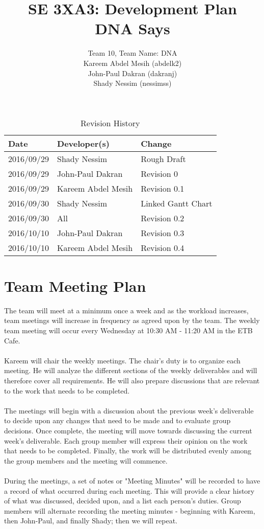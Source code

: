\documentclass{article}
\title{SE 3XA3: Development Plan\\DNA Says}
\author{Team 10, Team Name: DNA
		\\ Kareem Abdel Mesih (abdelk2)
		\\ John-Paul Dakran (dakranj)
		\\ Shady Nessim (nessimss)
}
\date{}
\begin{document}
\maketitle
\newpage
\tableofcontents

\begin{table}[hp]
\caption{Revision History} \label{TblRevisionHistory}
\begin{tabularx}{\textwidth}{llX}
\toprule
\textbf{Date} & \textbf{Developer(s)} & \textbf{Change}\\
\midrule
2016/09/29 & Shady Nessim & Rough Draft\\
2016/09/29 & John-Paul Dakran &  Revision 0\\
2016/09/29 & Kareem Abdel Mesih &  Revision 0.1\\
2016/09/30 & Shady Nessim & Linked Gantt Chart\\
2016/09/30 & All & Revision 0.2\\
2016/10/10 & John-Paul Dakran & Revision 0.3\\
2016/10/10 & Kareem Abdel Mesih & Revision 0.4\\
\bottomrule
\end{tabularx}
\end{table}
\newpage
\newpage


\section{Team Meeting Plan} 
The team will meet at a minimum once a week and as the workload increases, team meetings will increase in frequency as agreed upon by the team. The weekly team meeting will occur every Wednesday at 10:30 AM - 11:20 AM in the ETB Cafe.\\
\\
\indent Kareem will chair the weekly meetings. The chair's duty is to organize each meeting. He will analyze the different sections of the weekly deliverables and will therefore cover all requirements. He will also prepare discussions that are relevant to the work that needs to be completed.\\
\\
\indent The meetings will begin with a discussion about the previous week's deliverable to decide upon any changes that need to be made and to evaluate group decisions. Once complete, the meeting will move towards discussing the current week's deliverable. Each group member will express their opinion on the work that needs to be completed. Finally, the work will be distributed evenly among the group members and the meeting will commence.\\
\\
\indent During the  meetings, a set of notes or "Meeting Minutes" will be recorded to have a record of what occurred during each meeting. This will provide a clear history of what was discussed, decided upon, and a list each person's duties. Group members will alternate recording the meeting minutes - beginning with Kareem, then John-Paul, and finally Shady; then we will repeat.
\end{document}
